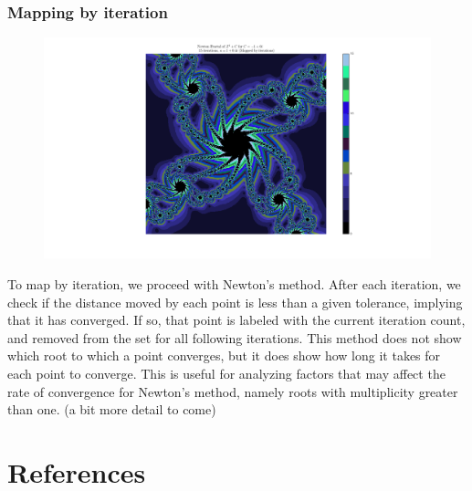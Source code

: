 \documentclass[12pt]{article}
\begin{document}
\begin{onehalfspace}
\subsubsection*{Mapping by iteration}
\begin{figure}[H]
	\centering
	\includegraphics[width=0.7\linewidth]{images/goodImage3}
	\caption{}
	\label{fig:rootEx2}
\end{figure}
To map by iteration, we proceed with Newton’s method.  After each iteration, we check if the distance moved by each point is less than a given tolerance, implying that it has converged.  If so, that point is labeled with the current iteration count, and removed from the set for all following iterations. This method does not show which root to which a point converges, but it does show how long it takes for each point to converge.  This is useful for analyzing factors that may affect the rate of convergence for Newton’s method, namely roots with multiplicity greater than one. (a bit more detail to come)

\end{onehalfspace}
\pagebreak
\normalsize

\section*{References}

\begin{list}
\item\url{https://www.mcgoodwin.net/julia/juliajewels.html}
\item\url{http://math.bu.edu/DYSYS/FRACGEOM/node4.html}
\item\url{http://lodev.org/cgtutor/juliamandelbrot.html}
\item\url{http://www.relativitybook.com/CoolStuff/julia_set.html
\item\url{http://mrob.com/pub/muency/escaperadius.html}
\item\url{http://www.dartmouth.edu/~michaeldowns/writeup.pdf}
\item\url{https://www.whitman.edu/Documents/Academics/Mathematics/burton.pdf}
\item\url{https://www.mitchr.me/SS/newton/#firstprogram}
\item\url{http://www.chiark.greenend.org.uk/~sgtatham/newton}
\item\url{http://atmos.eas.cornell.edu/~mek236/fractal}
\item\url{http://young.physics.ucsc.edu/242/newton.pdf}

\end{list}
\end{document}
